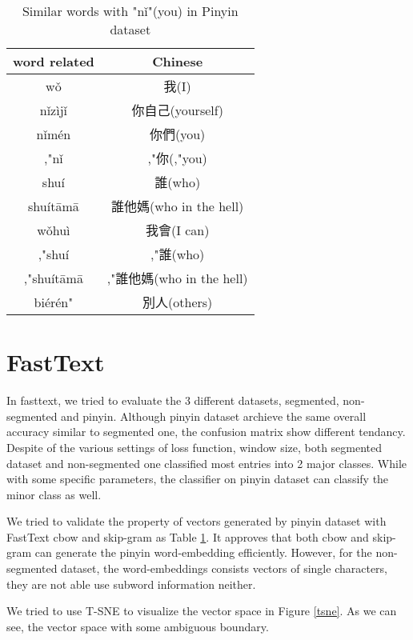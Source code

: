 \begin{table}[]
\centering
\caption{Similar words with "nǐ"(you) in Pinyin dataset}
\label{table:py_similar}
\begin{tabular}{|c|c|}
\hline
 word related  & Chinese  \\
\hline
wǒ         &   我(I)  \\
nǐzìjǐ     &   你自己(yourself) \\   
nǐmén      &   你們(you)   \\
,"nǐ       &   ,"你(,"you)  \\ 
shuí       &   誰(who)   \\
shuítāmā   &   誰他媽(who in the hell)\\   
wǒhuì      &   我會(I can)   \\
,"shuí     &   ,"誰(who)   \\
,"shuítāmā &   ,"誰他媽(who in the hell)\\   
biérén"    &   別人(others)\\
\hline
\end{tabular}
\end{table}


\section{FastText}

In fasttext, we tried to evaluate the 3 different datasets, segmented, non-segmented and pinyin. 
Although pinyin dataset archieve the same overall accuracy similar to segmented one, the confusion matrix show different tendancy.
Despite of the various settings of loss function, window size, both segmented dataset and non-segmented one classified most entries into 2 major classes.
While with some specific parameters, the classifier on pinyin dataset can classify the minor class as well. 

We tried to validate the property of vectors generated by pinyin dataset with FastText cbow and skip-gram as Table \ref{table:py_similar}. 
It approves that both cbow and skip-gram can generate the pinyin word-embedding efficiently. 
However, for the non-segmented dataset, the word-embeddings consists vectors of single characters, they are not able use subword information neither.


We tried to use T-SNE to visualize the vector space in Figure \ref{tsne}. As we can see, the vector space with some ambiguous boundary.

